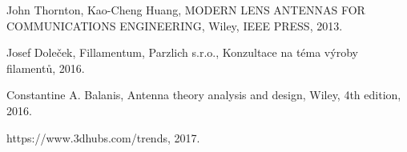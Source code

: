 
\begin{thebibliography}{9}

  John Thornton,
  Kao-Cheng Huang,
  MODERN LENS ANTENNAS FOR COMMUNICATIONS ENGINEERING,
  Wiley,
  IEEE PRESS,
  2013.

  Josef Doleček,
  Fillamentum,
  Parzlich s.r.o.,
  Konzultace na téma výroby filamentů,
  2016.

  Constantine A. Balanis,
  Antenna theory analysis and design,
  Wiley,
  4th edition,
  2016.

  https://www.3dhubs.com/trends,
  2017.
  

\end{thebibliography}

\newpage

\listoffigures

\newpage

\listoftables
